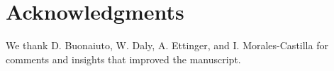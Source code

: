 \documentclass{article}\usepackage[]{graphicx}\usepackage[]{color}
\begin{document}
\section*{Acknowledgments}
We thank D. Buonaiuto,  W. Daly, A. Ettinger, and I. Morales-Castilla for comments and insights that improved the manuscript. 

\nocite{Schwartz1993}
\nocite{Barker2005}
\nocite{Sanchez2013}
\nocite{Longstroth2012}
\nocite{Barlow2015}
\nocite{Longstroth2013}
\nocite{Charrier2011}

\end{document}
